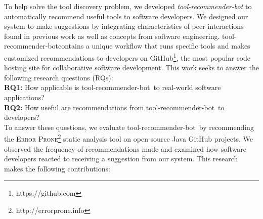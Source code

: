 \documentclass[conference]{IEEEtran}
\newcommand{\tool}{tool-recommender-bot}
\begin{document}
%

To help solve the tool discovery problem, we developed \textit{\tool} to automatically recommend useful tools to software developers. We designed our system to make suggestions by integrating characteristics of peer interactions found in previous work as well as concepts from software engineering. \tool contains a unique workflow that runs specific tools and makes customized recommendations to developers on GitHub\footnote{https://github.com}, the most popular code hosting site for collaborative software development. This work seeks to answer the following research questions (RQs): \\

\noindent
\textbf{RQ1:} How applicable is \tool~to real-world software applications?  \\ 
\textbf{RQ2:} How useful are recommendations from \tool~to developers?  \\

To answer these questions, we evaluate \tool~by recommending the \textsc{Error Prone}\footnote{http://errorprone.info} static analysis tool on open source Java GitHub projects. We observed the frequency of recommendations made and examined how software developers reacted to receiving a suggestion from our system. This research makes the following contributions:
\end{document}
